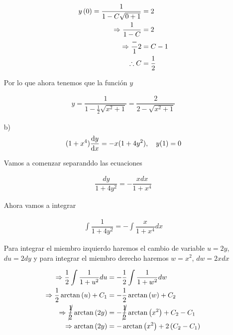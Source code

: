 \begin{enumerate}
 \begin{align*}
     y\left( 0 \right)=\dfrac{1}{1-C\sqrt{0+1}}&=2 \\ 
     \Rightarrow  \dfrac{1}{1-C}&=2 \\ 
     \Rightarrow \dfrac -{1}{2}&=C-1 \\ 
     \therefore C &= \dfrac{1}{2}
     \end{align*}
     
Por lo que ahora tenemos que la función $y$

\begin{align*}
    y=\dfrac{1}{1-\frac{1}{2}\sqrt{x^2+1}}=\dfrac{2}{2-\sqrt{x^2+1}}
\end{align*}
     
     \begin{center}
     \end{center}

 

    \item[b)]
\begin{align*}
    (1+x^{4})\dv{y}{x}=-x(1+4y^{2}), \quad y(1)=0
\end{align*}

Vamos a comenzar separanddo las ecuaciones 

\begin{align*}
    \dfrac{dy}{1+4y^2}=-\dfrac{xdx}{1+x^4}
\end{align*}

Ahora vamos a integrar

\begin{align*}
    \int \dfrac{1}{1+4y^2}=-\int \dfrac{x}{1+x^4}dx
\end{align*}

Para integrar el miembro izquierdo haremos el cambio de variable $u=2y$, $du=2dy$ y para integrar el miembro derecho haremos $w=x^2$, $dw=2xdx$

\begin{align*}
    \Rightarrow \dfrac{1}{2}\int \dfrac{1}{1+u^2} du &= -\dfrac{1}{2}\int \dfrac{1}{1+w^2}dw \\
    \Rightarrow \dfrac{1}{2} \arctan \left( u \right) + C_1 &= -\dfrac{1}{2}\arctan\left( w \right)+C_2 \\ 
    \Rightarrow \cancel{\dfrac{1}{2}} \arctan\left( 2y \right) &= -\cancel{\dfrac{1}{2}}\arctan\left( x^2 \right)+C_2-C_1 \\ 
    \Rightarrow \arctan\left( 2y \right)&=-\arctan\left( x^2 \right)+2\left( C_2-C_1 \right)
\end{align*}


\end{enumerate}

